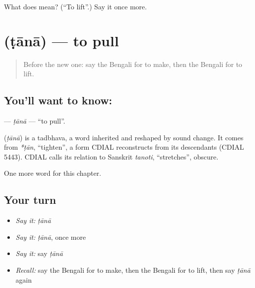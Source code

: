 \begin{tcolorbox}[breakable,colback=teal!4,colframe=teal!35!black,title={Before you move on}]
What does  mean? (\textquotedblleft{}To lift\textquotedblright{}.) Say it once more.
\end{tcolorbox}
\section[\texorpdfstring{\bn{টানা} (ṭānā)}{টানা (ṭānā)}]{ (ṭānā) — to pull}

\label{lesson:BN-C54-tana}



\begin{quote}
Before the new one: say the Bengali for to make, then the Bengali for to lift.
\end{quote}

\subsection*{You'll want to know: }
\textbf{} — \emph{ṭānā} — \textquotedblleft{}to pull\textquotedblright{}.

\begin{cousinweb}
\textbf{} (\emph{ṭānā}) is a tadbhava, a word inherited and reshaped by sound change. It comes from \emph{*ṭān}, \textquotedblleft{}tighten\textquotedblright{}, a form CDIAL reconstructs from its descendants (CDIAL 5443). CDIAL calls its relation to Sanskrit \emph{tanoti}, \textquotedblleft{}stretches\textquotedblright{}, obscure.
\end{cousinweb}

\begin{grammarlens}[title={What you've built}]
One more word for this chapter.
\end{grammarlens}

\subsection*{Your turn}
\begin{itemize}
\raggedright
  \item \emph{Say it:} \emph{ṭānā}
  \item \emph{Say it:} \emph{ṭānā}, once more
  \item \emph{Say it:} say \emph{ṭānā}
  \item \emph{Recall:} say the Bengali for to make, then the Bengali for to lift, then say \emph{ṭānā} again
\end{itemize}

